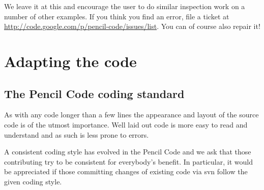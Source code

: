 \documentclass[\mydriver,12pt,twoside,notitlepage,a4paper]{article}
\begin{document}
We leave it at this and encourage the user to do similar
inspection work on a number of other examples.
If you think you find an error, file a ticket at
\url{http://code.google.com/p/pencil-code/issues/list}.
You can of course also repair it!

\section{Adapting the code}

\subsection{The {\sc Pencil Code} coding standard}

As with any code longer than a few lines the appearance and layout
of the source code is of the utmost importance.  Well laid out
code is more easy to read and understand and as such is less prone
to errors.

A consistent coding style has evolved in the {\sc Pencil Code} and we
ask that those contributing try to be consistent for everybody's
benefit.  In particular, it would be appreciated if those committing
changes of existing code via svn follow the given coding style.
\end{document}
